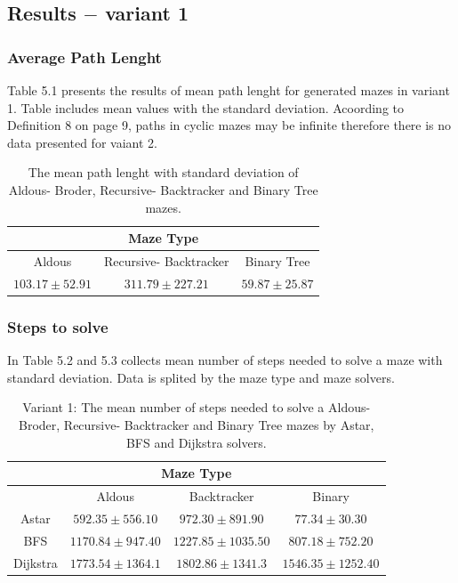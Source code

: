 \subsection{Results $-$ variant 1}
\subsubsection{Average Path Lenght}
Table 5.1 presents the results of mean path lenght for generated mazes in variant 1. Table includes mean values with the standard deviation.
Acoording to Definition 8 on page 9, paths in cyclic mazes may be infinite therefore there is no data presented for vaiant 2.
    \begin{table}[!h]
        \begin{center} 
            \caption{The mean path lenght with standard deviation of Aldous- Broder, Recursive- Backtracker and Binary Tree mazes.} 
        \begin{tabular}{ c c c } 
        \multicolumn{3}{c}{Maze Type} \\
        \hline
        Aldous&Recursive- Backtracker&Binary Tree\\
        \hline
        $103.17\pm 52.91$&$311.79\pm 227.21$&$59.87\pm 25.87$\\
        \hline
         \end{tabular} 
        \end{center}
         \end{table}
\subsubsection{Steps to solve}
In Table 5.2 and 5.3  collects mean number of steps needed to solve a maze with standard deviation. Data is splited by the maze type and maze solvers.
\begin{table}[!h]
    \begin{center} 
        \caption{Variant 1: The mean number of steps needed to solve a Aldous- Broder, Recursive- Backtracker and Binary Tree mazes by Astar,
         BFS and Dijkstra solvers.} 
    \begin{tabular}{ c c c c} 
    \multicolumn{4}{c}{Maze Type} \\
    \hline
    &Aldous&Backtracker&Binary\\
    \hline
    Astar&$592.35\pm 556.10$&$972.30\pm 891.90$&$77.34\pm 30.30$\\
    \hline
    BFS&$1170.84\pm 947.40$&$1227.85\pm 1035.50$&$807.18\pm 752.20$\\
    \hline
    Dijkstra&$1773.54\pm 1364.1$&$1802.86\pm 1341.3$&$1546.35\pm 1252.40$\\
    \hline
     \end{tabular} 
    \end{center}
     \end{table}

